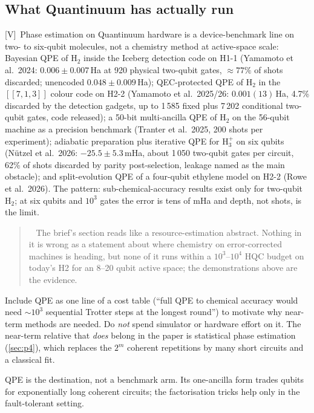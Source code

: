 \documentclass[11pt,a4paper]{article}
\newcommand{\lV}{\textcolor{keyblue}{[V]}}   %
\newenvironment{caution}[1][Caution]{\par\smallskip\begin{quotation}\noindent{\bfseries\textcolor{alertred}{#1.}}\ }{\end{quotation}\smallskip}
\newcommand{\takeaway}[1]{\par\smallskip\noindent{\bfseries\textcolor{keyblue}{Takeaway.}} #1\par\smallskip}
\newcommand{\verdict}[1]{\par\smallskip\noindent{\bfseries\textcolor{keyblue}{Verdict for our paper.}} #1\par\smallskip}
\begin{document}
\subsection{What Quantinuum has actually run}
\lV\ Phase estimation on Quantinuum hardware is a device-benchmark line on two- to six-qubit molecules, not a chemistry method at active-space scale: Bayesian QPE of H$_2$ inside the Iceberg detection code on H1-1 (Yamamoto et al.\ 2024: $0.006\pm0.007$\,Ha at 920 physical two-qubit gates, $\approx77\%$ of shots discarded; unencoded $0.048\pm0.009$\,Ha); QEC-protected QPE of H$_2$ in the $[[7,1,3]]$ colour code on H2-2 (Yamamoto et al.\ 2025/26: $0.001(13)$\,Ha, 4.7\% discarded by the detection gadgets, up to 1\,585 fixed plus 7\,202 conditional two-qubit gates, code released); a 50-bit multi-ancilla QPE of H$_2$ on the 56-qubit machine as a precision benchmark (Tranter et al.\ 2025, 200 shots per experiment); adiabatic preparation plus iterative QPE for H$_3^+$ on six qubits (N\"utzel et al.\ 2026: $-25.5\pm5.3$\,mHa, about 1\,050 two-qubit gates per circuit, 62\% of shots discarded by parity post-selection, leakage named as the main obstacle); and split-evolution QPE of a four-qubit ethylene model on H2-2 (Rowe et al.\ 2026). The pattern: sub-chemical-accuracy results exist only for two-qubit H$_2$; at six qubits and $10^3$ gates the error is tens of mHa and depth, not shots, is the limit.

\begin{caution}[Do not confuse the fault-tolerant road map with a near-term plan]
The brief's section reads like a resource-estimation abstract. Nothing in it is wrong as a statement about where chemistry on error-corrected machines is heading, but none of it runs within a $10^3$--$10^4$ HQC budget on today's H2 for an 8--20 qubit active space; the demonstrations above are the evidence.
\end{caution}

\verdict{Include QPE as one line of a cost table (``full QPE to chemical accuracy would need $\sim 10^{3}$ sequential Trotter steps at the longest round'') to motivate why near-term methods are needed. Do \emph{not} spend simulator or hardware effort on it. The near-term relative that \emph{does} belong in the paper is statistical phase estimation (\cref{sec:p4}), which replaces the $2^m$ coherent repetitions by many short circuits and a classical fit.}

\takeaway{QPE is the destination, not a benchmark arm. Its one-ancilla form trades qubits for exponentially long coherent circuits; the factorisation tricks help only in the fault-tolerant setting.}
\end{document}
